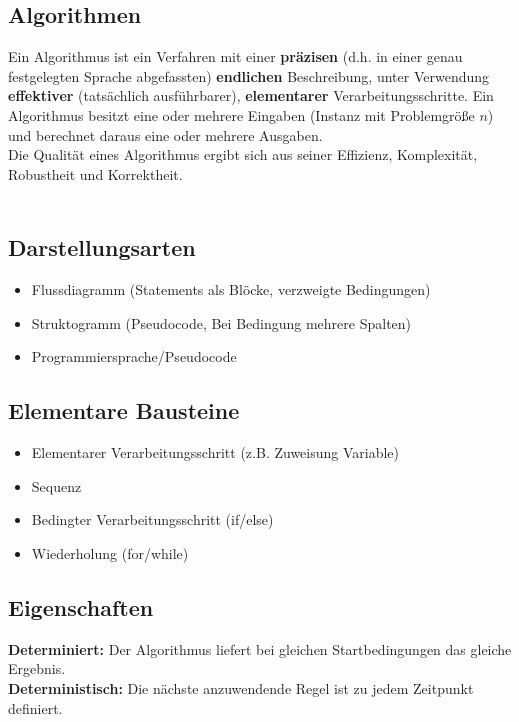 \documentclass[fs, footer]{latex4ei}
\begin{document}
\begin{multicols*}{4}
\section{Algorithmen}
Ein Algorithmus ist ein Verfahren mit einer \textbf{präzisen} (d.h. in einer genau festgelegten Sprache
abgefassten) \textbf{endlichen} Beschreibung, unter Verwendung \textbf{effektiver} (tatsächlich ausführbarer), \textbf{elementarer} Verarbeitungsschritte.
Ein Algorithmus besitzt eine oder mehrere Eingaben (Instanz mit Problemgröße $n$) und berechnet daraus eine oder mehrere Ausgaben.\\
Die Qualität eines Algorithmus ergibt sich aus seiner Effizienz, Komplexität, Robustheit und Korrektheit.\\
\\
\subsection{Darstellungsarten}
\begin{itemize}
\item Flussdiagramm (Statements als Blöcke, verzweigte Bedingungen)
\item Struktogramm (Pseudocode, Bei Bedingung mehrere Spalten)
\item Programmiersprache/Pseudocode
\end{itemize}
\subsection{Elementare Bausteine}
\begin{itemize}
\item Elementarer Verarbeitungsschritt (z.B. Zuweisung Variable)
\item Sequenz
\item Bedingter Verarbeitungsschritt (if/else)
\item Wiederholung (for/while)
\end{itemize}
\subsection{Eigenschaften}
\textbf{Determiniert:} Der Algorithmus liefert bei gleichen Startbedingungen das gleiche Ergebnis.\\
\textbf{Deterministisch:} Die nächste anzuwendende Regel ist zu jedem Zeitpunkt definiert.\\

\end{multicols*}
\end{document}
